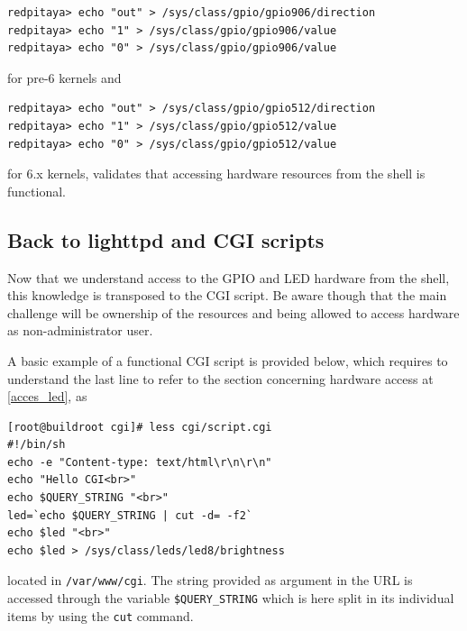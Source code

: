 \documentclass{article}
\begin{document}
{{\footnotesize
\begin{verbatim}
redpitaya> echo "out" > /sys/class/gpio/gpio906/direction 
redpitaya> echo "1" > /sys/class/gpio/gpio906/value 
redpitaya> echo "0" > /sys/class/gpio/gpio906/value 
\end{verbatim}
}

\noindent for pre-6 kernels and

{\footnotesize
\begin{verbatim}
redpitaya> echo "out" > /sys/class/gpio/gpio512/direction 
redpitaya> echo "1" > /sys/class/gpio/gpio512/value 
redpitaya> echo "0" > /sys/class/gpio/gpio512/value 
\end{verbatim}
}

\noindent for 6.x kernels, validates that accessing hardware resources from the shell is functional.

\subsection{Back to lighttpd and CGI scripts}

Now that we understand access to the GPIO and LED hardware from the shell, this knowledge
is transposed to the CGI script. Be aware though that the main challenge will be ownership
of the resources and being allowed to access hardware as non-administrator user.

A basic example of a functional CGI script is provided below, which requires to understand
the last line to refer to the section concerning hardware access at \ref{acces_led}, as
\begin{verbatim}
[root@buildroot cgi]# less cgi/script.cgi 
#!/bin/sh
echo -e "Content-type: text/html\r\n\r\n"
echo "Hello CGI<br>"
echo $QUERY_STRING "<br>"
led=`echo $QUERY_STRING | cut -d= -f2`
echo $led "<br>"
echo $led > /sys/class/leds/led8/brightness
\end{verbatim}
located in {\tt /var/www/cgi}.
The string provided as argument in the URL is accessed through the variable \verb~$QUERY_STRING~ 
which is here split in its individual items by using the {\tt cut} command.

}
\end{document}

